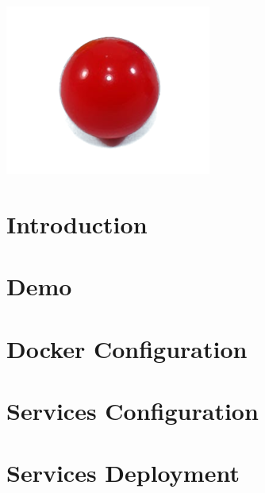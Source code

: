 \documentclass[11pt]{article}
\begin{document}
    \clearpage
    \maketitle
    \includegraphics[scale=1.5]{favicon}
    \thispagestyle{empty}

    \newpage
    \tableofcontents{}
    \thispagestyle{empty}

    \newpage
    \setcounter{page}{1}
    \section{Introduction}\label{sec:introduction}
    

    \newpage
    \section{Demo}\label{sec:Demo}
    

    \newpage
    \section{Docker Configuration}\label{sec:DockerConfiguration}
    

    \newpage
    \section{Services Configuration}\label{sec:ServicesConfiguration}
    

%    

    \newpage
    \section{Services Deployment}\label{sec:ServiceDeployment}
    
\end{document}
